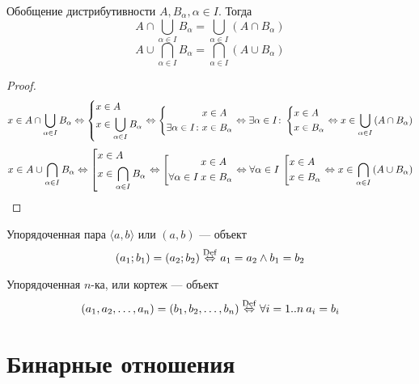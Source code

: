 \begin{theorem}{Обобщение дистрибутивности}
$ A, B_\alpha, \alpha \in I $.
Тогда 
$$ A \cap \bigcup_{\alpha \in I} B_\alpha = \bigcup_{\alpha \in I} (A \cap B_\alpha) $$
$$ A \cup \bigcap_{\alpha \in I} B_\alpha = \bigcap_{\alpha \in I} (A \cup B_\alpha) $$
\end{theorem}
\begin{proof}
$$
x \in A \cap \bigcup_{\alpha \in I} B_{\alpha} \Leftrightarrow \left\{\begin{aligned}x &\in A \\ x &\in \bigcup_{\alpha \in I} B_{\alpha}\end{aligned}\right. \Leftrightarrow 
\left\{\begin{aligned} x &\in A \\ \exists \alpha \in I\colon x &\in B_\alpha \end{aligned}\right. \Leftrightarrow
\exists \alpha \in I\colon \left\{\begin{aligned} x &\in A \\ x &\in B_\alpha \end{aligned}\right.  
\Leftrightarrow x \in \bigcup_{\alpha \in I} \left(A \cap B_\alpha\right) 
$$
$$
x \in A \cup \bigcap_{\alpha \in I} B_{\alpha} \Leftrightarrow \left[\begin{aligned}x &\in A \\ x &\in \bigcap_{\alpha \in I} B_{\alpha}\end{aligned}\right. \Leftrightarrow 
\left[\begin{aligned} x &\in A \\ \forall \alpha \in I\: x &\in B_\alpha \end{aligned}\right. \Leftrightarrow
\forall \alpha \in I\: \left[\begin{aligned} x &\in A \\ x &\in B_\alpha \end{aligned}\right.  
\Leftrightarrow x \in \bigcap_{\alpha \in I} \left(A \cup B_\alpha\right) 
$$
\end{proof}

\begin{Def}
Упорядоченная пара $\langle a, b \rangle$ или $(a, b)$ --- объект
$$ (a_1; b_1) = (a_2; b_2) \stackrel{\mathrm{Def}}{\Leftrightarrow} a_1 = a_2 \land b_1 = b_2 $$
\end{Def}
\begin{Def}
Упорядоченная $n$-ка, или кортеж --- объект
$$ (a_1, a_2, \ldots, a_n) = (b_1, b_2, \ldots, b_n) \stackrel{\mathrm{Def}}{\Leftrightarrow} \forall i=1..n\: a_i = b_i $$
\end{Def}

\section{Бинарные отношения}


